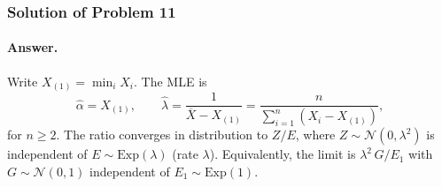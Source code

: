 \documentclass[11pt,a4paper]{article}
\begin{document}
\subsubsection{Solution of Problem 11}

\paragraph{Answer.}
Write \( X_{(1)}=\min_i X_i \). The MLE is
\[
\hat{\alpha}
=
X_{(1)},
\qquad
\hat{\lambda}
=
\frac{1}{\overline{X}-X_{(1)}}
=
\frac{n}{\sum_{i=1}^{n}(X_i-X_{(1)})},
\]
for \( n\ge 2 \). The ratio converges in distribution to \( Z/E \), where \( Z\sim\mathcal{N}(0,\lambda^{2}) \) is independent of \( E\sim\mathrm{Exp}(\lambda) \) (rate \( \lambda \)). Equivalently, the limit is \( \lambda^{2}\,G/E_1 \) with \( G\sim\mathcal{N}(0,1) \) independent of \( E_1\sim\mathrm{Exp}(1) \).
\end{document}

